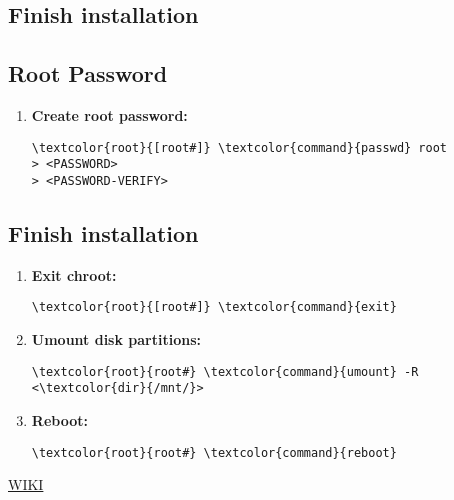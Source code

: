 \documentclass[10pt, a4paper, onecolumn, openany]{book} %
\begin{document}
\begin{enumerate}
\section{Finish installation}
\subsection{Root Password}
\begin{enumerate}
    \item \textbf{Create root password:}
\begin{Verbatim}[commandchars=\\\{\}]
\textcolor{root}{[root#]} \textcolor{command}{passwd} root
> <PASSWORD>
> <PASSWORD-VERIFY>
\end{Verbatim}
\end{enumerate}
\subsection{Finish installation}
\begin{enumerate}
    \item \textbf{Exit chroot:}
\begin{Verbatim}[commandchars=\\\{\}]
\textcolor{root}{[root#]} \textcolor{command}{exit}
\end{Verbatim}
    \item \textbf{Umount disk partitions:}
\begin{Verbatim}[commandchars=\\\{\}]
\textcolor{root}{root#} \textcolor{command}{umount} -R <\textcolor{dir}{/mnt/}>
\end{Verbatim}
    \item \textbf{Reboot:}
\begin{Verbatim}[commandchars=\\\{\}]
\textcolor{root}{root#} \textcolor{command}{reboot}
\end{Verbatim}
\end{enumerate}


\end{enumerate}
\href{https://wiki.archlinux.org/title/Installation_guide#Installation}{WIKI}
\end{document}

